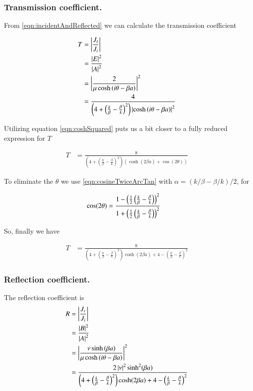 \documentclass{article}
\begin{document}
\subsubsection{ Transmission coefficient. }

From \ref{eqn:incidentAndReflected} we can calculate the transmission
coefficient

\begin{align*}
T 
&= \left\lvert{\frac{J_t}{J_i}}\right\rvert \\
&= \frac{\left\lvert{E}\right\rvert^2}{\left\lvert{A}\right\rvert^2} \\
&= \left\lvert{\frac{2  } { \mu \cosh\left( i\theta -\beta a \right) }}\right\rvert^2 \\
&= \frac{4} { 
\left(4 + \left( \frac{k}{\beta} -\frac{\beta}{k} \right)^2 \right)
\left\lvert{\cosh\left( i\theta -\beta a \right)}\right\rvert^2 }
\end{align*}

Utilizing equation \ref{eqn:coshSquared}
puts us a bit closer to a fully reduced expression for $T$

\begin{align*}
T 
&= \frac{8} { 
\left(4 + \left( \frac{k}{\beta} -\frac{\beta}{k} \right)^2 \right)
\left( \cosh(2\beta a) + \cos(2\theta) \right)
}
\end{align*}

To eliminate the $\theta$ we use \ref{eqn:cosineTwiceArcTan}
with $\alpha = ({k}/{\beta} - {\beta}/{k} )/2$, for

\begin{align*}
\cos(2\theta) 
&= 
\frac{ 1 - \left(\frac{1}{2} \left(\frac{k}{\beta} - \frac{\beta}{k} \right)\right)^2 }
{1 + \left(\frac{1}{2} \left(\frac{k}{\beta} - \frac{\beta}{k} \right)\right)^2}
\end{align*}

So, finally we have

\begin{align}\label{eqn:Tcoeff1}
T 
&= \frac{8} { 
\left(4 + \left( \frac{k}{\beta} -\frac{\beta}{k} \right)^2 \right)
\cosh(2\beta a)
+ 
4 - \left(\frac{k}{\beta} - \frac{\beta}{k} \right)^2 
}
\end{align}

\subsubsection{ Reflection coefficient. }

The reflection coefficient is
\begin{align*}
R 
&= \left\lvert{\frac{J_r}{J_i}}\right\rvert \\
&= \frac{\left\lvert{B}\right\rvert^2}{\left\lvert{A}\right\rvert^2} \\
&= 
\left\lvert{\frac{\nu \sinh\left( \beta a \right) }
{\mu \cosh\left( i\theta -\beta a \right) }}\right\rvert^2 \\
&= \frac{2 \left\lvert{\nu}\right\rvert^2 \sinh^2( \beta a)} { 
\left(4 + \left( \frac{k}{\beta} -\frac{\beta}{k} \right)^2 \right)
\cosh(2\beta a)
+ 
4 - \left(\frac{k}{\beta} - \frac{\beta}{k} \right)^2 
}
\end{align*}
\end{document}
